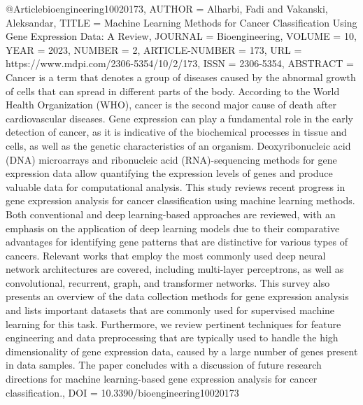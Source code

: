 @Article{bioengineering10020173,
AUTHOR = {Alharbi, Fadi and Vakanski, Aleksandar},
TITLE = {Machine Learning Methods for Cancer Classification Using Gene Expression Data: A Review},
JOURNAL = {Bioengineering},
VOLUME = {10},
YEAR = {2023},
NUMBER = {2},
ARTICLE-NUMBER = {173},
URL = {https://www.mdpi.com/2306-5354/10/2/173},
ISSN = {2306-5354},
ABSTRACT = {Cancer is a term that denotes a group of diseases caused by the abnormal growth of cells that can spread in different parts of the body. According to the World Health Organization (WHO), cancer is the second major cause of death after cardiovascular diseases. Gene expression can play a fundamental role in the early detection of cancer, as it is indicative of the biochemical processes in tissue and cells, as well as the genetic characteristics of an organism. Deoxyribonucleic acid (DNA) microarrays and ribonucleic acid (RNA)-sequencing methods for gene expression data allow quantifying the expression levels of genes and produce valuable data for computational analysis. This study reviews recent progress in gene expression analysis for cancer classification using machine learning methods. Both conventional and deep learning-based approaches are reviewed, with an emphasis on the application of deep learning models due to their comparative advantages for identifying gene patterns that are distinctive for various types of cancers. Relevant works that employ the most commonly used deep neural network architectures are covered, including multi-layer perceptrons, as well as convolutional, recurrent, graph, and transformer networks. This survey also presents an overview of the data collection methods for gene expression analysis and lists important datasets that are commonly used for supervised machine learning for this task. Furthermore, we review pertinent techniques for feature engineering and data preprocessing that are typically used to handle the high dimensionality of gene expression data, caused by a large number of genes present in data samples. The paper concludes with a discussion of future research directions for machine learning-based gene expression analysis for cancer classification.},
DOI = {10.3390/bioengineering10020173}
}